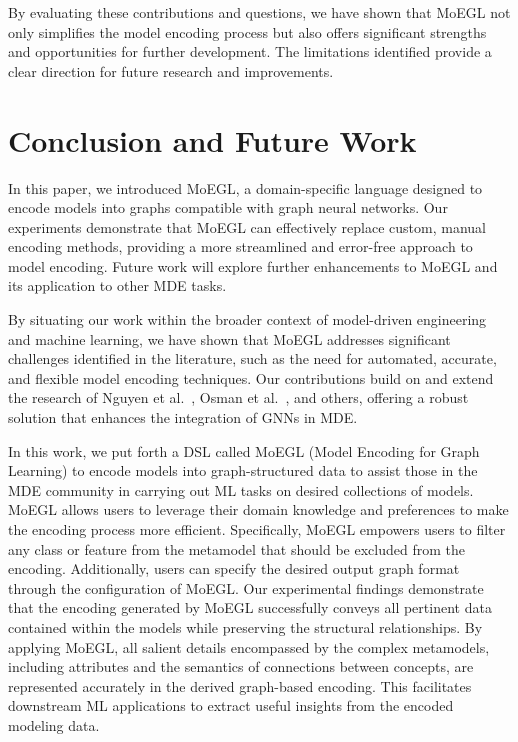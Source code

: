 \documentclass[journal,article,submit,moreauthors,technologies]{Definitions/mdpi}
\begin{document}
By evaluating these contributions and questions, we have shown that MoEGL not only simplifies the model encoding process but also offers significant strengths and opportunities for further development. The limitations identified provide a clear direction for future research and improvements.


\section{Conclusion and Future Work} \label{Sec:conclusion}

In this paper, we introduced MoEGL, a domain-specific language designed to encode models into graphs compatible with graph neural networks. Our experiments demonstrate that MoEGL can effectively replace custom, manual encoding methods, providing a more streamlined and error-free approach to model encoding. Future work will explore further enhancements to MoEGL and its application to other MDE tasks.

By situating our work within the broader context of model-driven engineering and machine learning, we have shown that MoEGL addresses significant challenges identified in the literature, such as the need for automated, accurate, and flexible model encoding techniques. Our contributions build on and extend the research of Nguyen et al.~\cite{nguyen2019automated}, Osman et al.~\cite{osman2018automated}, and others, offering a robust solution that enhances the integration of GNNs in MDE.

In this work, we put forth a DSL called MoEGL (Model Encoding for Graph Learning) to encode models into graph-structured data to assist those in the MDE community in carrying out ML tasks on desired collections of models. MoEGL allows users to leverage their domain knowledge and preferences to make the encoding process more efficient. Specifically, MoEGL empowers users to filter any class or feature from the metamodel that should be excluded from the encoding. Additionally, users can specify the desired output graph format through the configuration of MoEGL. Our experimental findings demonstrate that the encoding generated by MoEGL successfully conveys all pertinent data contained within the models while preserving the structural relationships. By applying MoEGL, all salient details encompassed by the complex metamodels, including attributes and the semantics of connections between concepts, are represented accurately in the derived graph-based encoding. This facilitates downstream ML applications to extract useful insights from the encoded modeling data.
\end{document}
